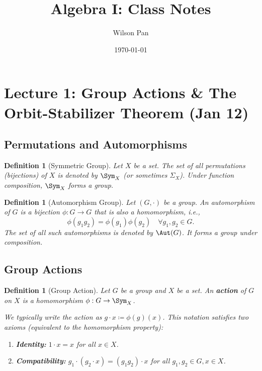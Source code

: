 \documentclass[a4paper,12pt]{article}
\title{\textbf{Algebra I: Class Notes}}
\author{Wilson Pan}
\date{\today}
\newtheorem{defn}[thm]{Definition}
\begin{document}
\maketitle
\tableofcontents
\newpage

\section{Lecture 1: Group Actions \& The Orbit-Stabilizer Theorem (Jan 12)}

\subsection{Permutations and Automorphisms}

\begin{defn}[Symmetric Group]
    Let $X$ be a set. The set of all permutations (bijections) of $X$ is denoted by $\Sym_X$ (or sometimes $\Sigma_X$). Under function composition, $\Sym_X$ forms a group.
\end{defn}

\begin{defn}[Automorphism Group]
    Let $(G, \cdot)$ be a group. An automorphism of $G$ is a bijection $\phi: G \to G$ that is also a homomorphism, i.e.,
    \[ \phi(g_1 g_2) = \phi(g_1)\phi(g_2) \quad \forall g_1, g_2 \in G. \]
    The set of all such automorphisms is denoted by $\Aut(G)$. It forms a group under composition.
\end{defn}

\subsection{Group Actions}

\begin{defn}[Group Action]
    Let $G$ be a group and $X$ be a set. An \textbf{action} of $G$ on $X$ is a homomorphism $\phi: G \to \Sym_X$.
    
    We typically write the action as $g \cdot x \coloneqq \phi(g)(x)$. This notation satisfies two axioms (equivalent to the homomorphism property):
    \begin{enumerate}
        \item \textbf{Identity:} $1 \cdot x = x$ for all $x \in X$.
        \item \textbf{Compatibility:} $g_1 \cdot (g_2 \cdot x) = (g_1 g_2) \cdot x$ for all $g_1, g_2 \in G, x \in X$.
    \end{enumerate}
\end{defn}
\end{document}

